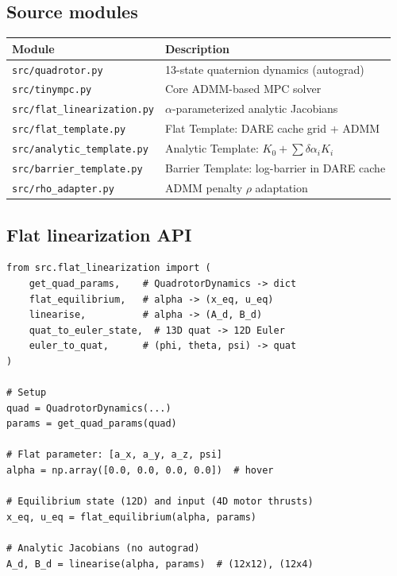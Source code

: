 \documentclass[11pt]{article}
\begin{document}
\subsection{Source modules}

\begin{center}
\renewcommand{\arraystretch}{1.2}
\begin{tabular}{@{}l l@{}}
\toprule
\textbf{Module} & \textbf{Description} \\
\midrule
\texttt{src/quadrotor.py} & 13-state quaternion dynamics (autograd) \\
\texttt{src/tinympc.py} & Core ADMM-based MPC solver \\
\texttt{src/flat\_linearization.py} & $\alpha$-parameterized analytic Jacobians \\
\texttt{src/flat\_template.py} & Flat Template: DARE cache grid + ADMM \\
\texttt{src/analytic\_template.py} & Analytic Template: $K_0 + \sum \delta\alpha_i K_i$ \\
\texttt{src/barrier\_template.py} & Barrier Template: log-barrier in DARE cache \\
\texttt{src/rho\_adapter.py} & ADMM penalty $\rho$ adaptation \\
\bottomrule
\end{tabular}
\end{center}

\subsection{Flat linearization API}

\begin{lstlisting}[caption={flat\_linearization.py}]
from src.flat_linearization import (
    get_quad_params,    # QuadrotorDynamics -> dict
    flat_equilibrium,   # alpha -> (x_eq, u_eq)
    linearise,          # alpha -> (A_d, B_d)
    quat_to_euler_state,  # 13D quat -> 12D Euler
    euler_to_quat,      # (phi, theta, psi) -> quat
)

# Setup
quad = QuadrotorDynamics(...)
params = get_quad_params(quad)

# Flat parameter: [a_x, a_y, a_z, psi]
alpha = np.array([0.0, 0.0, 0.0, 0.0])  # hover

# Equilibrium state (12D) and input (4D motor thrusts)
x_eq, u_eq = flat_equilibrium(alpha, params)

# Analytic Jacobians (no autograd)
A_d, B_d = linearise(alpha, params)  # (12x12), (12x4)
\end{lstlisting}
\end{document}
